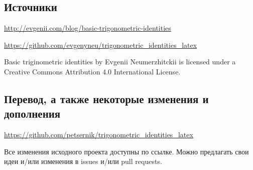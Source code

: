 \subsection*{Источники}

\url{http://evgenii.com/blog/basic-trigonometric-identities}

\url{https://github.com/evgenyneu/trigonometric_identities_latex}

Basic triginometric identities by Evgenii Neumerzhitckii is licensed under a Creative Commons Attribution 4.0 International License.

\subsection*{Перевод, а также некоторые изменения и дополнения}

\url{https://github.com/petsernik/trigonometric_identities_latex}

Все изменения исходного проекта доступны по ссылке. Можно предлагать свои идеи и/или изменения в issues и/или pull requests.